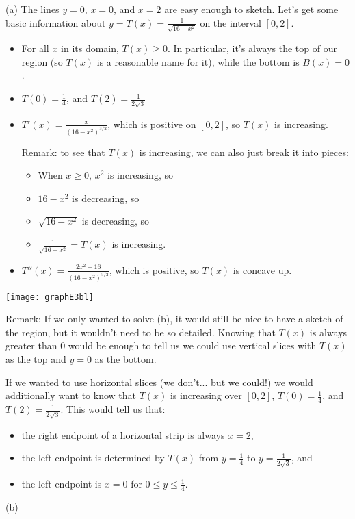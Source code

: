\begin{solution} (a) The lines $y=0$, $x=0$, and $x=2$ are easy enough to sketch. Let's get some basic information about $y=T(x)=\frac{1}{\sqrt{16-x^2}}$ on the interval $[0,2]$.
\begin{itemize}
\item For all $x$ in its domain, $T(x) \geq 0$. In particular, it's always the top of our region (so $T(x)$ is a reasonable name for it), while the bottom is $B(x)=0$.
\item $T(0)=\frac{1}{4}$, and $T(2)=\frac{1}{2\sqrt{3}}$
\item $T'(x) = \frac{x}{(16-x^2)^{3/2}}$, which is positive on $[0,2]$, so $T(x)$ is increasing.

Remark: to see that $T(x)$ is increasing, we can also just break it into pieces:
\begin{itemize}
\item When $x \ge 0$, $x^2$ is increasing, so
\item $16-x^2$ is decreasing, so
\item $\sqrt{16-x^2}$ is decreasing, so
\item $\frac{1}{\sqrt{16-x^2}}=T(x)$ is increasing.
\end{itemize}

\item $T''(x)=\frac{2x^2+16}{(16-x^2)^{5/2}}$, which is positive, so $T(x)$ is concave up.
\end{itemize}


\begin{center}
       \texttt{[image: graphE3bl]}
\end{center}

Remark: If we only wanted to solve (b), it would still be nice to have a sketch of the region, but it wouldn't need to be so detailed. Knowing that $T(x)$ is always greater than 0 would be enough to tell us we could use vertical slices with $T(x)$ as the top and $y=0$ as the bottom.

 If we wanted to use horizontal slices (we don't... but we could!) we would additionally want to know that $T(x)$ is increasing over $[0,2]$, $T(0)=\frac{1}{4}$, and $T(2)=\frac{1}{2\sqrt{3}}$. This would tell us that:
 \begin{itemize}
 \item the right endpoint of a horizontal strip is always $x=2$,
 \item the left endpoint is determined by $T(x)$ from $y=\frac{1}{4}$ to $y=\frac{1}{2\sqrt{3}}$, and
 \item the left endpoint is $x=0$ for $0 \le y \le \frac{1}{4}$.
\end{itemize}
\noindent (b)


\end{solution}
